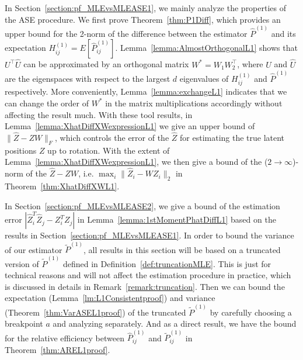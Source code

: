 \documentclass[a4paper]{article}
\renewcommand{\hat}{\widehat}
\begin{document}
In Section~\ref{section:pf_MLEvsMLEASE1}, we mainly analyze the properties of the ASE procedure. We first prove Theorem~\ref{thm:P1Diff}, which provides an upper bound for the 2-norm of the difference between the estimator $\hat{P}^{(1)}$ and its expectation $H_{ij}^{(1)} = E[\hat{P}_{ij}^{(1)}]$. Lemma~\ref{lemma:AlmostOrthogonalL1} shows that $U^{\top} \hat{U}$ can be approximated by an orthogonal matrix $W^{*} = W_1 W_2^{\top}$, where $U$ and $\hat{U}$ are the eigenspaces with respect to the largest $d$ eigenvalues of $H_{ij}^{(1)}$ and $\hat{P}^{(1)}$ respectively. More conveniently, Lemma~\ref{lemma:exchangeL1} indicates that we can change the order of $W^*$ in the matrix multiplications accordingly without affecting the result much. With these tool results, in Lemma~\ref{lemma:XhatDiffXWexpressionL1} we give an upper bound of $\|\hat{Z} - Z W\|_F$, which controls the error of the $\hat{Z}$ for estimating the true latent positions $Z$ up to rotation. 
With the extent of Lemma~\ref{lemma:XhatDiffXWexpressionL1}, we then give a bound of the ($2 \to \infty$)-norm of the $\hat{Z} - Z W$, i.e. $\max_i \| \hat{Z}_i - W Z_i \|_2$ in Theorem~\ref{thm:XhatDiffXWL1}.

In Section~\ref{section:pf_MLEvsMLEASE2}, we give a bound of the estimation error $\left|  \hat{Z}_i^T \hat{Z}_j - Z_i^T Z_j \right|$ in Lemma~\ref{lemma:1stMomentPhatDiffL1} based on the results in Section~\ref{section:pf_MLEvsMLEASE1}. In order to bound the variance of our estimator $\widetilde{P}^{(1)}$, all results in this section will be based on a truncated version of $\widetilde{P}^{(1)}$ defined in Definition~\ref{def:truncationMLE}. This is just for technical reasons and will not affect the estimation procedure in practice, which is discussed in details in Remark~\ref{remark:truncation}. Then we can bound the expectation (Lemma~\ref{lm:L1Consistentproof}) and variance (Theorem~\ref{thm:VarASEL1proof}) of the truncated $\widetilde{P}^{(1)}$ by carefully choosing a breakpoint $a$ and analyzing separately. And as a direct result, we have the bound for the relative efficiency between $\hat{P}_{ij}^{(1)}$ and $\widetilde{P}_{ij}^{(1)}$ in Theorem~\ref{thm:AREL1proof}.
\end{document}
